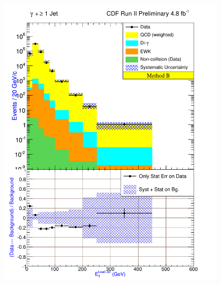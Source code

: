 \documentclass[12pt,twoside,letterpaper,doublespace]{article}
\begin{document}
\begin{figure}[h!]
{\includegraphics[keepaspectratio=true, scale=\figScale]{G30Jets_MtdB_plot1_Et_j1.pdf}}

\end{figure}
\end{document}
